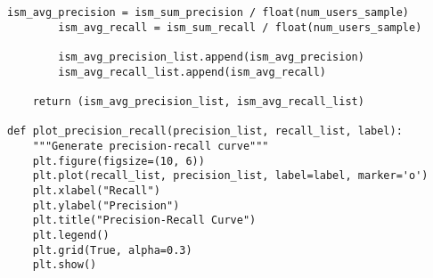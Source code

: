 \documentclass[12pt,a4paper]{article}
\begin{document}
\begin{lstlisting}[caption=Precision-Recall Evaluation Implementation]
        ism_avg_precision = ism_sum_precision / float(num_users_sample)
        ism_avg_recall = ism_sum_recall / float(num_users_sample)

        ism_avg_precision_list.append(ism_avg_precision)
        ism_avg_recall_list.append(ism_avg_recall)

    return (ism_avg_precision_list, ism_avg_recall_list)

def plot_precision_recall(precision_list, recall_list, label):
    """Generate precision-recall curve"""
    plt.figure(figsize=(10, 6))
    plt.plot(recall_list, precision_list, label=label, marker='o')
    plt.xlabel("Recall")
    plt.ylabel("Precision")
    plt.title("Precision-Recall Curve")
    plt.legend()
    plt.grid(True, alpha=0.3)
    plt.show()
\end{lstlisting}
\end{document}
